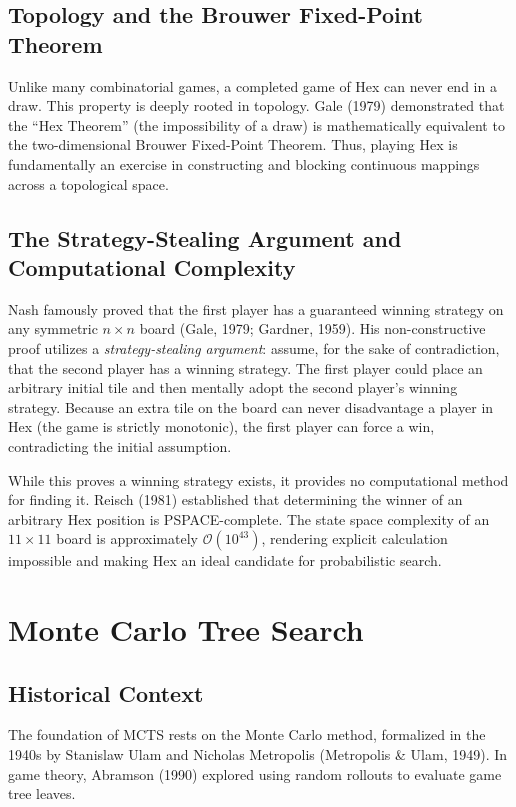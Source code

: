 \documentclass[12pt,a4paper]{article}
\begin{document}
\subsection{Topology and the Brouwer Fixed-Point Theorem}
Unlike many combinatorial games, a completed game of Hex can never end in a draw. This property is deeply rooted in topology. Gale (1979) demonstrated that the ``Hex Theorem'' (the impossibility of a draw) is mathematically equivalent to the two-dimensional Brouwer Fixed-Point Theorem. Thus, playing Hex is fundamentally an exercise in constructing and blocking continuous mappings across a topological space.

\subsection{The Strategy-Stealing Argument and Computational Complexity}
Nash famously proved that the first player has a guaranteed winning strategy on any symmetric $n \times n$ board (Gale, 1979; Gardner, 1959). His non-constructive proof utilizes a \textit{strategy-stealing argument}: assume, for the sake of contradiction, that the second player has a winning strategy. The first player could place an arbitrary initial tile and then mentally adopt the second player's winning strategy. Because an extra tile on the board can never disadvantage a player in Hex (the game is strictly monotonic), the first player can force a win, contradicting the initial assumption.

While this proves a winning strategy exists, it provides no computational method for finding it. Reisch (1981) established that determining the winner of an arbitrary Hex position is PSPACE-complete. The state space complexity of an $11 \times 11$ board is approximately $\mathcal{O}(10^{43})$, rendering explicit calculation impossible and making Hex an ideal candidate for probabilistic search.

\section{Monte Carlo Tree Search}
\subsection{Historical Context}
The foundation of MCTS rests on the Monte Carlo method, formalized in the 1940s by Stanislaw Ulam and Nicholas Metropolis (Metropolis \& Ulam, 1949). In game theory, Abramson (1990) explored using random rollouts to evaluate game tree leaves. 
\end{document}
